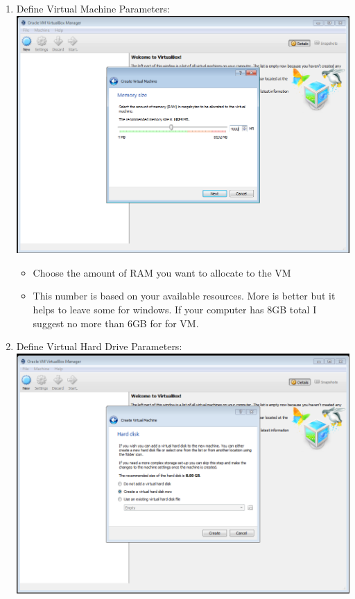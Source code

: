 \documentclass[12pt]{article}
\begin{document}
\begin{description}
\begin{enumerate}
\begin{itemize}
            \end{itemize}
	\newpage
\item Define Virtual Machine Parameters: \vspace{20mm} \\
      		\hspace*{-2.5cm}\includegraphics[scale=.6]{Capture3.png}\\
            \begin{itemize}
                
                \item Choose the amount of RAM you want to allocate to the VM
                \item This number is based on your available resources. More is better but it helps to leave some for windows. If your computer has 8GB total I suggest no more than 6GB for for VM.  
                
            \end{itemize}
	\newpage
\item Define Virtual Hard Drive Parameters: \vspace{20mm} \\
      		\hspace*{-2.5cm}\includegraphics[scale=.6]{Capture4.png}\\
 \begin{itemize}
                

\end{itemize}
\end{enumerate}
\end{description}
\end{document}
